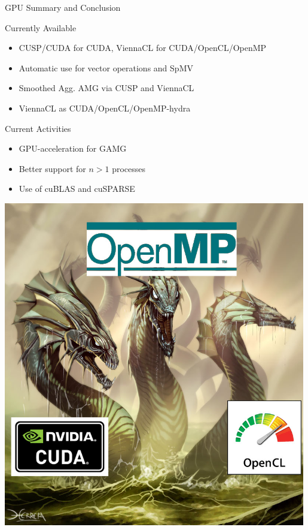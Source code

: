 \begin{frame}{GPU Summary and Conclusion}

  \begin{block}{Currently Available}
    \begin{itemize}
     \item CUSP/CUDA for CUDA, ViennaCL for CUDA/OpenCL/OpenMP
     \item Automatic use for vector operations and SpMV
     \item Smoothed Agg. AMG via CUSP and ViennaCL
      \item ViennaCL as CUDA/OpenCL/OpenMP-hydra
    \end{itemize}
  \end{block}

  \begin{minipage}{0.7\textwidth}
    \begin{block}{Current Activities}
      \begin{itemize}
      \item GPU-acceleration for GAMG
      \item Better support for $n>1$ processes
      \item Use of cuBLAS and cuSPARSE
      \end{itemize}
    \end{block}
  \end{minipage}
  \begin{minipage}{0.29\textwidth}
    \includegraphics[width=0.99\textwidth]{figures/hydra}
  \end{minipage}

\end{frame}


